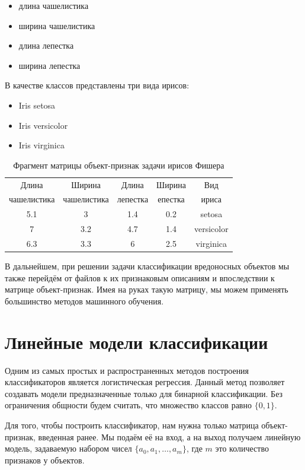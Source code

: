 \begin{itemize}
\item длина чашелистика
\item ширина чашелистика
\item длина лепестка
\item ширина лепестка
\end{itemize}

В качестве классов представлены три вида ирисов:
\begin{itemize}
\item Iris setosa
\item Iris versicolor
\item Iris virginica 
\end{itemize}


\begin{table}[ht]
\caption{Фрагмент матрицы объект-признак задачи ирисов Фишера}
\label{tab_weight}
\centering
    \begin{tabular}{|c|c|c|c|c|}
    \hline Длина  & Ширина  & Длина  & Ширина  & Вид  \\
    чашелистика & чашелистика & лепестка & епестка & ириса \\
    \hline 5.1 & 3 & 1.4 & 0.2 & setosa  \\
    \hline 7 & 3.2 & 4.7 & 1.4 & versicolor  \\
    \hline 6.3 & 3.3 & 6 & 2.5 & virginica  \\
    \hline
    \end{tabular}
\end{table}

В дальнейшем, при решении задачи классификации вредоносных объектов мы также перейдём от файлов к их признаковым описаниям и впоследствии к матрице объект-признак.
Имея на руках такую матрицу, мы можем применять большинство методов машинного обучения.

\section{Линейные модели классификации}

Одним из самых простых и распространенных методов построения классификаторов является логистическая регрессия. Данный метод позволяет создавать модели предназначенные только для бинарной классификации. Без ограничения общности будем считать, что множество классов равно $\{0, 1\}$.

Для того, чтобы построить классификатор, нам нужна только матрица объект-признак, введенная ранее. Мы подаём её на вход, а на выход получаем линейную модель, задаваемую набором чисел $\{a_0, a_1,…, a_m\}$, где $m$ это количество признаков у объектов. 

